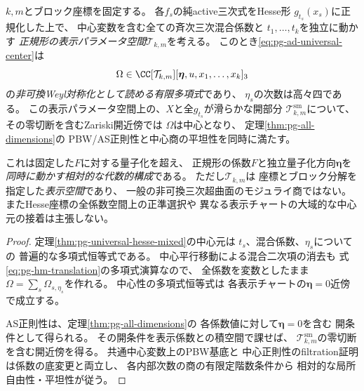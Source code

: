 \begin{proposition}[正規形の係数も動く相対普遍公式]
\label{prop:pg-ad-relative-chart}
$k,m$とブロック座標を固定する。
各$f_s$の純active三次式をHesse形
$g_{t_s}(x_s)$に正規化した上で、
中心変数を含む全ての斉次三次混合係数と
$t_1,\ldots,t_k$を独立に動かす
\emph{正規形の表示パラメータ空間}$\mathcal T_{k,m}$を考える。
このとき\eqref{eq:pg-ad-universal-center}は
\begin{equation}
 \Omega\in
 \CC[\mathcal T_{k,m}][\boldsymbol\eta,u,x_1,\ldots,x_k]_3
\end{equation}
の\emph{非可換Weyl対称化として読める有限多項式}であり、
$\eta_s$の次数は高々四である。
この表示パラメータ空間上の、$X$と全$g_{t_s}$が滑らかな開部分
$\mathcal T_{k,m}^{\mathrm{sm}}$について、
その零切断を含むZariski開近傍では
$\Omega$は中心となり、
定理\ref{thm:pg-all-dimensions}の
PBW/AS正則性と中心商の平坦性を同時に満たす。

これは固定した$F$に対する量子化を超え、
正規形の係数$F$と独立量子化方向$\boldsymbol\eta$を
\emph{同時に動かす相対的な代数的構成}である。
ただし$\mathcal T_{k,m}$は
座標とブロック分解を指定した\emph{表示空間}であり、
一般の非可換三次超曲面のモジュライ商ではない。
またHesse座標の全係数空間上の正準選択や
異なる表示チャートの大域的な中心元の接着は主張しない。
\end{proposition}
\begin{proof}
定理\ref{thm:pg-universal-hesse-mixed}の中心元は
$t_s$、混合係数、$\eta_s$についての
普遍的な多項式恒等式である。
中心平行移動による混合二次項の消去も
式\eqref{eq:pg-hm-translation}の多項式演算なので、
全係数を変数としたまま
$\Omega=\sum_s\Omega_{s,\eta_s}$を作れる。
中心性の多項式恒等式は
各表示チャートの$\boldsymbol\eta=0$近傍で成立する。

AS正則性は、定理\ref{thm:pg-all-dimensions}の
各係数値に対して$\boldsymbol\eta=0$を含む
開条件として得られる。
その開条件を表示係数との積空間で課せば、
$\mathcal T_{k,m}^{\mathrm{sm}}$の零切断を含む開近傍を得る。
共通中心変数上のPBW基底と
中心正則性のfiltration証明は係数の底変更と両立し、
各内部次数の商の有限定階数条件から
相対的な局所自由性・平坦性が従う。
\end{proof}

